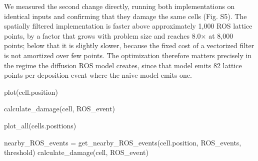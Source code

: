 \documentclass{asmarticle}
\begin{document}
We measured the second change directly, running both implementations on identical inputs and confirming that they damage the same cells (Fig. S5). The spatially filtered implementation is faster above approximately 1{,}000 ROS lattice points, by a factor that grows with problem size and reaches 8.0$\times$ at 8{,}000 points; below that it is slightly slower, because the fixed cost of a vectorized filter is not amortized over few points. The optimization therefore matters precisely in the regime the diffusion ROS model creates, since that model emits 82 lattice points per deposition event where the naive model emits one.

\begin{algorithm}[!ht]
\caption{Plotting each cell individually per generation}
\begin{algorithmic}[1]
        \State plot(cell.position)
    \EndFor
\EndFor
\end{algorithmic}
\end{algorithm}

\begin{algorithm}[!ht]
\caption{ROS damage calculation for each event}
\begin{algorithmic}[1]
            \State calculate\_damage(cell, ROS\_event)
        \EndIf
    \EndFor
\EndFor
\end{algorithmic}
\end{algorithm}

\begin{algorithm}[!ht]
\caption{Plotting all cells simultaneously per generation}
\begin{algorithmic}[1]
    \State plot\_all(cells.positions)
\EndFor
\end{algorithmic}
\end{algorithm}

\begin{algorithm}[!ht]
\caption{ROS damage calculation considering nearby ROS events}
\begin{algorithmic}[1]
    \State nearby\_ROS\_events = get\_nearby\_ROS\_events(cell.position, ROS\_events, threshold)
        \State calculate\_damage(cell, ROS\_event)
    \EndFor
\EndFor
\end{algorithmic}
\end{algorithm}
\end{document}
